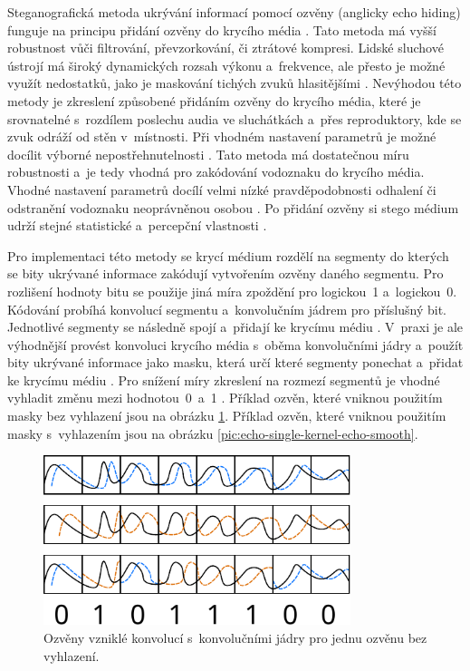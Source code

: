 Steganografická metoda ukrývání informací pomocí ozvěny (anglicky echo hiding)
funguje na principu přidání ozvěny do krycího média \cite{Djebbar2012}. Tato
metoda má vyšší robustnost vůči filtrování, převzorkování, či ztrátové
kompresi. Lidské sluchové ústrojí má široký dynamických rozsah výkonu
a~frekvence, ale přesto je možné využít nedostatků, jako je maskování tichých
zvuků hlasitějšími \cite{Gruhl1996}. Nevýhodou této metody je zkreslení
způsobené přidáním ozvěny do krycího média, které je srovnatelné s~rozdílem
poslechu audia ve sluchátkách a~přes reproduktory, kde se zvuk odráží od stěn
v~místnosti. Při vhodném nastavení parametrů je možné docílit výborné
nepostřehnutelnosti \cite{Gruhl1996}. Tato metoda má dostatečnou míru
robustnosti a~je tedy vhodná pro zakódování vodoznaku do krycího média. Vhodné
nastavení parametrů docílí velmi nízké pravděpodobnosti odhalení či odstranění
vodoznaku neoprávněnou osobou \cite{Gruhl1996}. Po přidání ozvěny si stego
médium udrží stejné statistické a~percepční vlastnosti \cite{Djebbar2012}.

Pro implementaci této metody se krycí médium rozdělí na segmenty do kterých se
bity ukrývané informace zakódují vytvořením ozvěny daného segmentu. Pro
rozlišení hodnoty bitu se použije jiná míra zpoždění pro logickou~1
a~logickou~0. Kódování probíhá konvolucí segmentu a~konvolučním jádrem pro
příslušný bit. Jednotlivé segmenty se následně spojí a~přidají ke krycímu médiu
\cite{Gruhl1996}. V~praxi je ale výhodnější provést konvoluci krycího média
s~oběma konvolučními jádry a~použít bity ukrývané informace jako masku, která
určí které segmenty ponechat a~přidat ke krycímu médiu \cite{Gruhl1996}. Pro
snížení míry zkreslení na rozmezí segmentů je vhodné vyhladit změnu mezi
hodnotou~0~a~1 \cite{Tekeli2017}. Příklad ozvěn, které vniknou použitím masky
bez vyhlazení jsou na obrázku \ref{pic:echo-single-kernel-echo}. Příklad ozvěn,
které vniknou použitím masky s~vyhlazením jsou na obrázku
\ref{pic:echo-single-kernel-echo-smooth}.

\begin{figure}[hbt]
    \centering
    \includegraphics[width=0.8\textwidth]{obrazky/echo-diagram.pdf}
    \caption{Ozvěny vzniklé konvolucí s~konvolučními jádry pro jednu ozvěnu bez
    vyhlazení.}
    \label{pic:echo-single-kernel-echo}
\end{figure}


